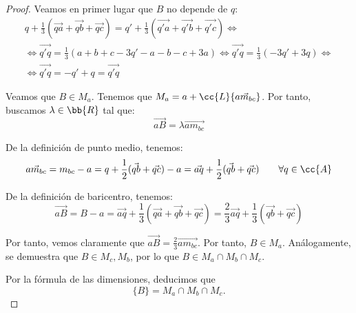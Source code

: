 \begin{proof}
    Veamos en primer lugar que $B$ no depende de $q$:
    \begin{multline*}
        q + \frac{1}{3}\left(\vec{qa} + \vec{qb} + \vec{qc}\right) = q' + \frac{1}{3}\left(\vec{q'a} + \vec{q'b} + \vec{q'c}\right) 
        \Longleftrightarrow \\
        \Longleftrightarrow
        \vec{q'q} = \frac{1}{3}\left(a+b+c-3q'-a-b-c+3a\right)
        \Longleftrightarrow
        \vec{q'q} = \frac{1}{3}\left(-3q'+3q\right)
        \Longleftrightarrow\\ \Longleftrightarrow
        \vec{q'q} = -q'+q = \vec{q'q}
    \end{multline*}

    Veamos que $B\in M_a$. Tenemos que $M_a = a + \cc{L}\{\vec{am_{bc}}\}$. Por tanto, buscamos $\lambda\in \bb{R}$ tal que:
    \begin{equation*}
        \vec{aB} = \lambda \vec{am_{bc}}
    \end{equation*}

    De la definición de punto medio, tenemos:
    \begin{equation*}
        \vec{am_{bc}} = m_{bc} - a = q+\frac{1}{2}(\vec{qb} + \vec{qc}) -a = \vec{aq}+\frac{1}{2}(\vec{qb} + \vec{qc}) \qquad \forall q\in \cc{A}
    \end{equation*}

    De la definición de baricentro, tenemos:
    \begin{equation*}
        \vec{aB} = B-a = \vec{aq} + \frac{1}{3}\left(\vec{qa} + \vec{qb} + \vec{qc}\right)
        = \frac{2}{3}\vec{aq} + \frac{1}{3}(\vec{qb} + \vec{qc})
    \end{equation*}

    Por tanto, vemos claramente que $\vec{aB}=\frac{2}{3}\vec{am_{bc}}$. Por tanto, $B\in M_a$. Análogamente, se demuestra que $B\in M_c,M_b$, por lo que $B\in M_a\cap M_b\cap M_c$.

    Por la fórmula de las dimensiones, deducimos que $$\{B\}=M_a\cap M_b\cap M_c.$$
\end{proof}



